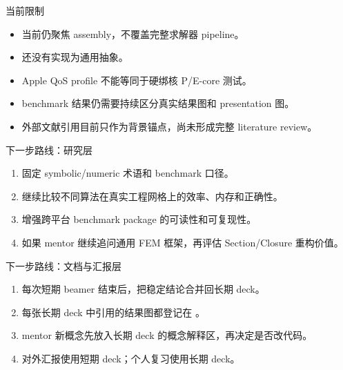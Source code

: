 \begin{frame}{当前限制}
\begin{itemize}
  \item 当前仍聚焦 assembly，不覆盖完整求解器 pipeline。
  \item {} 还没有实现为通用抽象。
  \item Apple QoS profile 不能等同于硬绑核 P/E-core 测试。
  \item benchmark 结果仍需要持续区分真实结果图和 presentation 图。
  \item 外部文献引用目前只作为背景锚点，尚未形成完整 literature review。
\end{itemize}
\end{frame}

\begin{frame}{下一步路线：研究层}
\begin{enumerate}
  \item 固定 symbolic/numeric 术语和 benchmark 口径。
  \item 继续比较不同算法在真实工程网格上的效率、内存和正确性。
  \item 增强跨平台 benchmark package 的可读性和可复现性。
  \item 如果 mentor 继续追问通用 FEM 框架，再评估 Section/Closure 重构价值。
\end{enumerate}
\end{frame}

\begin{frame}{下一步路线：文档与汇报层}
\begin{enumerate}
  \item 每次短期 beamer 结束后，把稳定结论合并回长期 deck。
  \item 每张长期 deck 中引用的结果图都登记在 。
  \item mentor 新概念先放入长期 deck 的概念解释区，再决定是否改代码。
  \item 对外汇报使用短期 deck；个人复习使用长期 deck。
\end{enumerate}
\end{frame}
